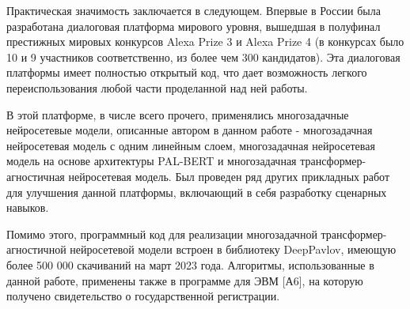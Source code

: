 \iffalse
Направления исследований 1.2.2:
1. Разработка новых математических методов моделирования объектов и
явлений (физико-математические науки).
2. Разработка, обоснование и тестирование эффективных вычислительных
методов с применением современных компьютерных технологий.
3. Реализация эффективных численных методов и алгоритмов в виде
комплексов проблемно-ориентированных программ для проведения
вычислительного эксперимента.
4. Разработка новых математических методов и алгоритмов интерпретации
натурного эксперимента на основе его математической модели.
5. Разработка новых математических методов и алгоритмов валидации
математических моделей объектов на основе данных натурного эксперимента
или на основе анализа математических моделей.
6. Разработка систем компьютерного и имитационного моделирования,
алгоритмов и методов имитационного моделирования на основе анализа
математических моделей (технические науки).
7. Качественные или аналитические методы исследования математических
моделей (технические науки).
8. Комплексные исследования научных и технических проблем с
применением современной технологии математического моделирования и
вычислительного эксперимента.
9. Постановка и проведение численных экспериментов, статистический
анализ их результатов, в том числе с применением современных
компьютерных технологий (технические науки).
\fi


{\influence}
Практическая значимость заключается в следующем. Впервые в России была разработана диалоговая платформа мирового уровня, вышедшая в полуфинал престижных мировых конкурсов Alexa Prize 3 и Alexa Prize 4 (в конкурсах было 10 и 9 участников соответственно, из более чем 300 кандидатов). Эта диалоговая платформы имеет полностью открытый код, что дает возможность легкого переиспользования любой части проделанной над ней работы. 

В этой платформе, в числе всего прочего, применялись многозадачные нейросетевые модели, описанные автором в данном работе - многозадачная нейросетевая модель с одним линейным слоем, многозадачная нейросетевая модель на основе архитектуры PAL-BERT и многозадачная трансформер-агностичная нейросетевая модель. Был проведен ряд других прикладных работ для улучшения данной платформы, включающий в себя разработку сценарных навыков.

Помимо этого, программный код для реализации многозадачной трансформер-агностичной нейросетевой модели встроен в библиотеку DeepPavlov, имеющую более 500 000 скачиваний на март 2023 года.
Алгоритмы, использованные в данной работе, применены также в программе для ЭВМ [А6], на которую получено свидетельство о государственной регистрации.


